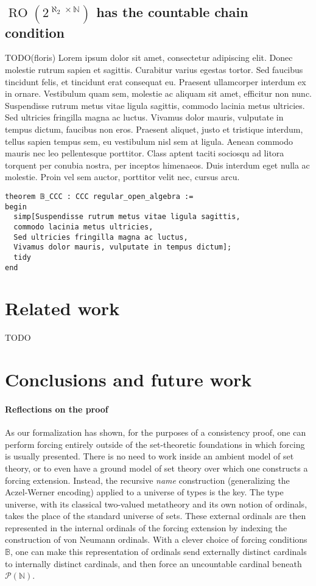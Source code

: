\documentclass[a4paper,USenglish,cleveref, autoref]{lipics-v2019}
\newcommand{\B}{\mathbb{B}}
\newcommand{\N}{\mathbb{N}}
\theoremstyle{definition}
\begin{document}
\subsection{$\operatorname{RO}(2^{\aleph_2 \times \mathbb{N}})$ has the countable chain condition}
TODO(floris)
Lorem ipsum dolor sit amet, consectetur adipiscing elit. Donec molestie rutrum sapien et sagittis. Curabitur varius egestas tortor. Sed faucibus tincidunt felis, et tincidunt erat consequat eu. Praesent ullamcorper interdum ex in ornare. Vestibulum quam sem, molestie ac aliquam sit amet, efficitur non nunc. Suspendisse rutrum metus vitae ligula sagittis, commodo lacinia metus ultricies. Sed ultricies fringilla magna ac luctus. Vivamus dolor mauris, vulputate in tempus dictum, faucibus non eros. Praesent aliquet, justo et tristique interdum, tellus sapien tempus sem, eu vestibulum nisl sem at ligula. Aenean commodo mauris nec leo pellentesque porttitor. Class aptent taciti sociosqu ad litora torquent per conubia nostra, per inceptos himenaeos. Duis interdum eget nulla ac molestie. Proin vel sem auctor, porttitor velit nec, cursus arcu.

\begin{lstlisting}
theorem 𝔹_CCC : CCC regular_open_algebra :=
begin
  simp[Suspendisse rutrum metus vitae ligula sagittis,
  commodo lacinia metus ultricies,
  Sed ultricies fringilla magna ac luctus,
  Vivamus dolor mauris, vulputate in tempus dictum];
  tidy
end
\end{lstlisting}

\section{Related work}
TODO

\section{Conclusions and future work}
\paragraph*{Reflections on the proof}
As our formalization has shown, for the purposes of a consistency proof, one can perform forcing entirely outside of the set-theoretic foundations in which forcing is usually presented. There is no need to work inside an ambient model of set theory, or to even have a ground model of set theory over which one constructs a forcing extension. Instead, the recursive \emph{name} construction (generalizing the Aczel-Werner encoding) applied to a universe of types is the key. The type universe, with its classical two-valued metatheory and its own notion of ordinals, takes the place of the standard universe of sets. These external ordinals are then represented in the internal ordinals of the forcing extension by indexing the construction of von Neumann ordinals. With a clever choice of forcing conditions $\B$, one can make this representation of ordinals send externally distinct cardinals to internally distinct cardinals, and then force an uncountable cardinal beneath $\mathcal{P}(\N)$.
\end{document}
